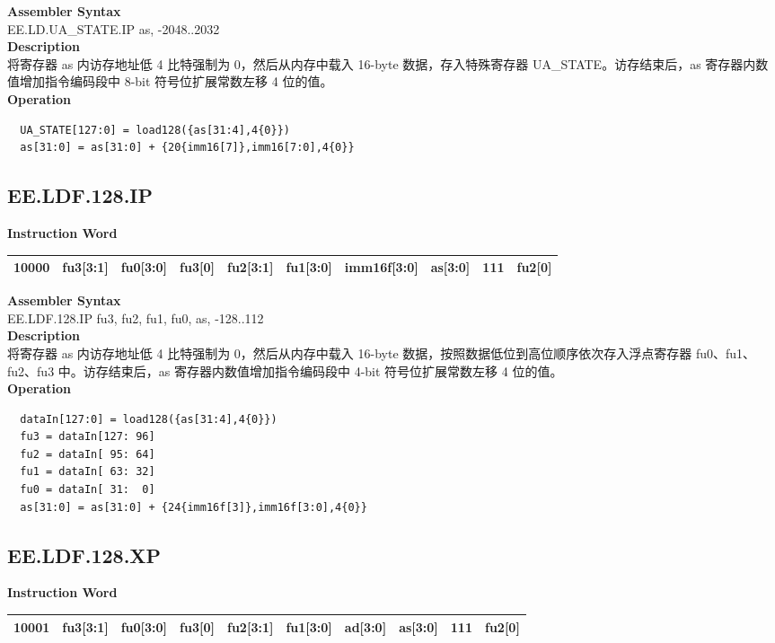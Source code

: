 \textbf{Assembler Syntax} \\
EE.LD.UA\_STATE.IP as, -2048..2032 \\
\textbf{Description} \\
将寄存器 as 内访存地址低 4 比特强制为 0，然后从内存中载入 16-byte 数据，存入特殊寄存器 UA\_STATE。访存结束后，as 寄存器内数值增加指令编码段中 8-bit 符号位扩展常数左移 4 位的值。\\
\textbf{Operation}
\begin{lstlisting}
  UA_STATE[127:0] = load128({as[31:4],4{0}})
  as[31:0] = as[31:0] + {20{imm16[7]},imm16[7:0],4{0}}
\end{lstlisting}

\clearpage
\subsection{EE.LDF.128.IP}\label{instruction:EELDF128IP}
\setlength\tabcolsep{6pt}
\textbf{Instruction Word} \\
\begin{tabular}{|c|c|c|c|c|c|c|c|c|c|}
	\hline
	10000 & fu3[3:1] & fu0[3:0] & fu3[0] & fu2[3:1] & fu1[3:0] & imm16f[3:0] & as[3:0] & 111 & fu2[0] \\
	\hline
\end{tabular}

\textbf{Assembler Syntax} \\
EE.LDF.128.IP fu3, fu2, fu1, fu0, as, -128..112 \\
\textbf{Description} \\
将寄存器 as 内访存地址低 4 比特强制为 0，然后从内存中载入 16-byte 数据，按照数据低位到高位顺序依次存入浮点寄存器 fu0、fu1、fu2、fu3 中。访存结束后，as 寄存器内数值增加指令编码段中 4-bit 符号位扩展常数左移 4 位的值。\\
\textbf{Operation}
\begin{lstlisting}
  dataIn[127:0] = load128({as[31:4],4{0}})
  fu3 = dataIn[127: 96]
  fu2 = dataIn[ 95: 64]
  fu1 = dataIn[ 63: 32]
  fu0 = dataIn[ 31:  0]
  as[31:0] = as[31:0] + {24{imm16f[3]},imm16f[3:0],4{0}}
\end{lstlisting}

\clearpage
\subsection{EE.LDF.128.XP}\label{instruction:EELDF128XP}
\setlength\tabcolsep{6pt}
\textbf{Instruction Word} \\
\begin{tabular}{|c|c|c|c|c|c|c|c|c|c|}
	\hline
	10001 & fu3[3:1] & fu0[3:0] & fu3[0] & fu2[3:1] & fu1[3:0] & ad[3:0] & as[3:0] & 111 & fu2[0] \\
	\hline
\end{tabular}

